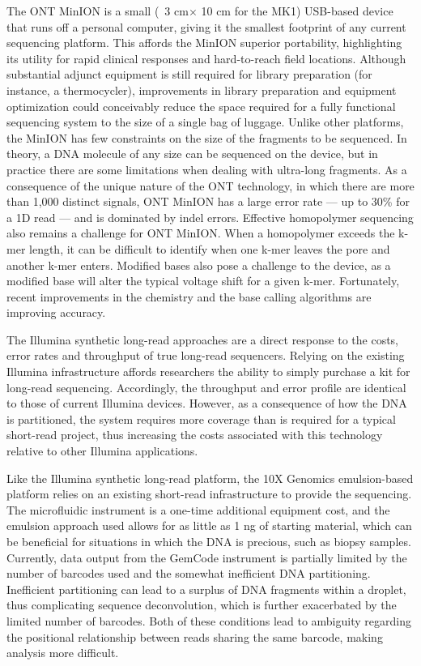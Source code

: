 The ONT MinION is a small (~3 cm$\times$ 10 cm for the MK1) USB-based device that runs off a personal computer, giving it the smallest footprint of any current 
sequencing platform. This affords the MinION superior portability, highlighting its utility for rapid clinical responses and hard-to-reach field locations. Although 
substantial adjunct equipment is still required for library preparation (for instance, a thermocycler), improvements in library preparation and equipment optimization could conceivably reduce the space required for a 
fully functional sequencing system to the size of a single bag of luggage. Unlike other platforms, the MinION has few constraints on the size of the fragments to be sequenced. In theory, a DNA molecule of any size can 
be sequenced on the device, but in practice there are some limitations when dealing with ultra-long fragments. As a consequence of the unique nature of the ONT technology, in which there are more than 1,000 
distinct signals, ONT MinION has a large error rate — up to 30\% for a 1D read — and is dominated by indel errors. Effective homopolymer sequencing also remains a challenge for ONT MinION. When a homopolymer 
exceeds the k-mer length, it can be difficult to identify when one k-mer leaves the pore and another k-mer enters. Modified bases also pose a challenge to the device, as a modified base will alter the typical voltage 
shift for a given k-mer. Fortunately, recent improvements in the chemistry and the base calling algorithms are improving accuracy.

The Illumina synthetic long-read approaches are a direct response to the costs, error rates and throughput of true long-read sequencers. Relying on the existing 
Illumina infrastructure affords researchers the ability to simply purchase a kit for long-read sequencing. Accordingly, the throughput and error profile are identical to those of current Illumina devices. However, 
as  a  consequence  of  how  the  DNA  is  partitioned, the system requires more coverage than is required for a typical short-read project, thus increasing the costs associated with this technology relative to other 
Illumina applications.


Like  the  Illumina  synthetic  long-read  platform, the 10X Genomics emulsion-based platform relies on an existing short-read infrastructure to provide the 
sequencing. The microfluidic instrument is a one-time additional equipment cost, and the emulsion approach used allows for as little as 1 ng of starting material, which 
can be beneficial for situations in which the DNA is precious, such as biopsy samples. Currently, data output from the GemCode instrument is partially limited by 
the number of barcodes used and the somewhat inefficient DNA partitioning. Inefficient partitioning can lead to a surplus of DNA fragments within a droplet, thus 
complicating sequence deconvolution, which is further exacerbated by the limited number of barcodes. Both of these conditions lead to ambiguity regarding the 
positional relationship between reads sharing the same barcode, making analysis more difficult.

